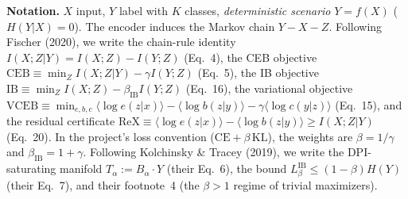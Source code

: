 
\newtheorem{lemma}{Lemma}
\newtheorem{proposition}{Proposition}
\newtheorem{remark}{Remark}

\textbf{Notation.}
$X$ input, $Y$ label with $K$ classes, \emph{deterministic scenario} $Y = f(X)$
($H(Y|X) = 0$). The encoder induces the Markov chain $Y - X - Z$. Following
Fischer (2020), we write the chain-rule identity $I(X;Z|Y) = I(X;Z) - I(Y;Z)$ (Eq.~4),
the CEB objective $\mathrm{CEB} \equiv \min_Z I(X;Z|Y) - \gamma I(Y;Z)$ (Eq.~5), the IB
objective $\mathrm{IB} \equiv \min_Z I(X;Z) - \beta_{\mathrm{IB}} I(Y;Z)$ (Eq.~16), the
variational objective
$\mathrm{VCEB} \equiv \min_{e,b,c} \langle \log e(z|x)\rangle - \langle \log b(z|y)\rangle
- \gamma \langle \log c(y|z)\rangle$ (Eq.~15), and the residual certificate
$\mathrm{ReX} \equiv \langle \log e(z|x)\rangle - \langle \log b(z|y)\rangle
\ge I(X;Z|Y)$ (Eq.~20). In the project's loss convention
($\mathrm{CE} + \beta\,\mathrm{KL}$), the weights are $\beta = 1/\gamma$ and
$\beta_{\mathrm{IB}} = 1 + \gamma$. Following Kolchinsky \& Tracey (2019), we write the
DPI-saturating manifold $T_\alpha := B_\alpha \cdot Y$ (their Eq.~6), the bound
$L^{\mathrm{IB}}_\beta \le (1-\beta)H(Y)$ (their Eq.~7), and their footnote~4
(the $\beta > 1$ regime of trivial maximizers).

